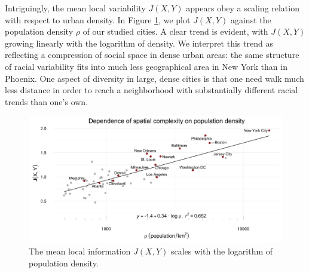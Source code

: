 Intriguingly, the mean local variability $J(X,Y)$ appears obey a scaling relation with respect to urban density. In Figure \ref{fig:density}, we plot $J(X,Y)$ against the population density $\rho$ of our studied cities. A clear trend is evident, with $J(X,Y)$ growing linearly with the logarithm of density. We interpret this trend as reflecting a compression of social space in dense urban areas: the same structure of racial variability fits into much less geographical area in New York than in Phoenix. One aspect of diversity in large, dense cities is that one need walk much less distance in order to reach a neighborhood with substantially different racial trends than one's own. 
 
	\begin{figure}
		\includegraphics[width=1\textwidth]{figs/density_fisher.png}
		\caption{The mean local information $J(X,Y)$ scales with the logarithm of population density.}
		\label{fig:density}
	\end{figure}	
